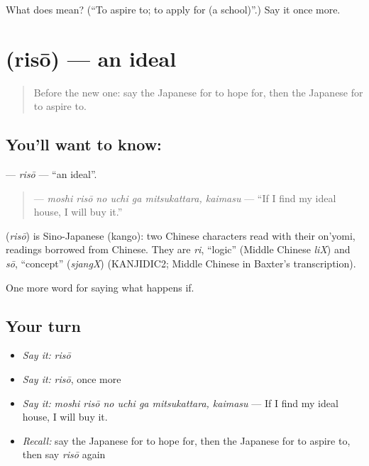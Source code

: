 \begin{tcolorbox}[breakable,colback=teal!4,colframe=teal!35!black,title={Before you move on}]
What does  mean? (\textquotedblleft{}To aspire to; to apply for (a school)\textquotedblright{}.) Say it once more.
\end{tcolorbox}
\section[\texorpdfstring{\ja{りそう} (risō)}{りそう (risō)}]{ (risō) — an ideal}

\label{lesson:JA-C507-risou}



\begin{quote}
Before the new one: say the Japanese for to hope for, then the Japanese for to aspire to.
\end{quote}

\subsection*{You'll want to know: }
\textbf{} — \emph{risō} — \textquotedblleft{}an ideal\textquotedblright{}.

\begin{quote}
\textbf{   } — \emph{moshi risō no uchi ga mitsukattara, kaimasu} — \textquotedblleft{}If I find my ideal house, I will buy it.\textquotedblright{}
\end{quote}

\begin{cousinweb}
\textbf{} (\emph{risō}) is Sino-Japanese (kango): two Chinese characters read with their on'yomi, readings borrowed from Chinese. They are \emph{ri}, \textquotedblleft{}logic\textquotedblright{} (Middle Chinese \emph{liX}) and \emph{sō}, \textquotedblleft{}concept\textquotedblright{} (\emph{sjangX}) (KANJIDIC2; Middle Chinese in Baxter's transcription).
\end{cousinweb}

\begin{grammarlens}[title={What you've built}]
One more word for saying what happens if.
\end{grammarlens}

\subsection*{Your turn}
\begin{itemize}
\raggedright
  \item \emph{Say it:} \emph{risō}
  \item \emph{Say it:} \emph{risō}, once more
  \item \emph{Say it:} \emph{moshi risō no uchi ga mitsukattara, kaimasu} — If I find my ideal house, I will buy it.
  \item \emph{Recall:} say the Japanese for to hope for, then the Japanese for to aspire to, then say \emph{risō} again
\end{itemize}

